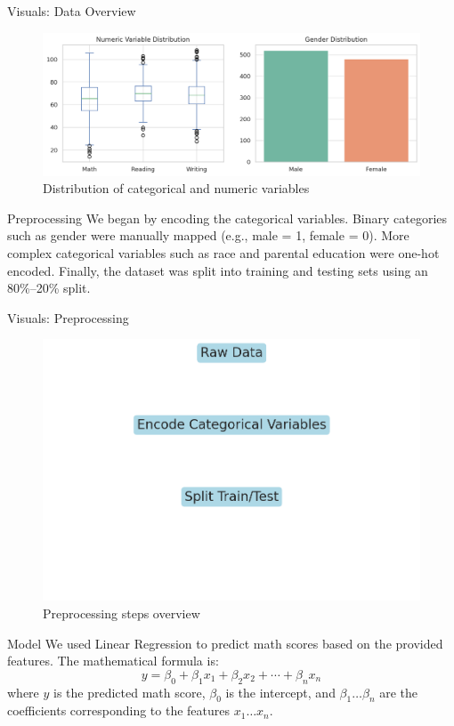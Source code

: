 \documentclass{beamer}
\begin{document}
\begin{frame}{Visuals: Data Overview}
  \begin{figure}
    \includegraphics[width=0.9\linewidth]{data_distribution.png}
    \caption{Distribution of categorical and numeric variables}
  \end{figure}
\end{frame}

\begin{frame}{Preprocessing}
  We began by encoding the categorical variables. Binary categories such as gender were manually mapped (e.g., male = 1, female = 0). More complex categorical variables such as race and parental education were one-hot encoded. Finally, the dataset was split into training and testing sets using an 80\%--20\% split.
\end{frame}

\begin{frame}{Visuals: Preprocessing}
  \begin{figure}
    \includegraphics[width=0.9\linewidth]{preprocessing_pipeline.png}
    \caption{Preprocessing steps overview}
  \end{figure}
\end{frame}

\begin{frame}{Model}
  We used Linear Regression to predict math scores based on the provided features. The mathematical formula is:
  \[
  y = \beta_0 + \beta_1 x_1 + \beta_2 x_2 + \cdots + \beta_n x_n
  \]
  where \( y \) is the predicted math score, \( \beta_0 \) is the intercept, and \( \beta_1 \ldots \beta_n \) are the coefficients corresponding to the features \( x_1 \ldots x_n \).
\end{frame}
\end{document}
